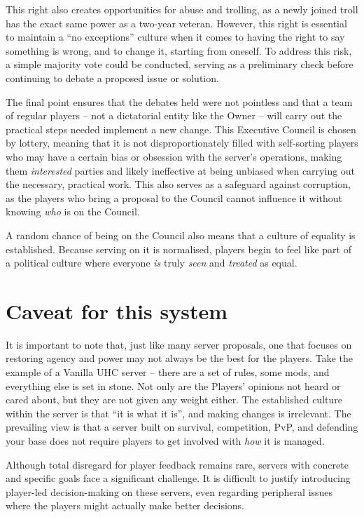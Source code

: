This right also creates opportunities for abuse and trolling, as a newly joined troll has the exact same power as a two-year veteran. However, this right is essential to maintain a “no exceptions” culture when it comes to having the right to say something is wrong, and to change it, starting from oneself. To address this risk, a simple majority vote could be conducted, serving as a preliminary check before continuing to debate a proposed issue or solution.

The final point ensures that the debates held were not pointless and that a team of regular players – not a dictatorial entity like the Owner – will carry out the practical steps needed implement a new change. This Executive Council is chosen by lottery, meaning that it is not disproportionately filled with self-sorting players who may have a certain bias or obsession with the server’s operations, making them \emph{interested} parties and likely ineffective at being unbiased when carrying out the necessary, practical work. This also serves as a safeguard against corruption, as the players who bring a proposal to the Council cannot influence it without knowing \emph{who} is on the Council.

A random chance of being on the Council also means that a culture of equality is established. Because serving on it is normalised, players begin to feel like part of a political culture where everyone \emph{is} truly \emph{seen} and \emph{treated} as equal.

\section{Caveat for this system}
It is important to note that, just like many server proposals, one that focuses on restoring agency and power may not always be the best for the players. Take the example of a Vanilla UHC server – there are a set of rules, some mods, and everything else is set in stone. Not only are the Players’ opinions not heard or cared about, but they are not given any weight either. The established culture within the server is that “it is what it is”, and making changes is irrelevant. The prevailing view is that a server built on survival, competition, PvP, and defending your base does not require players to get involved with \emph{how} it is managed.

Although total disregard for player feedback remains rare, servers with concrete and specific goals face a significant challenge. It is difficult to justify introducing player-led decision-making on these servers, even regarding peripheral issues where the players might actually make better decisions.

